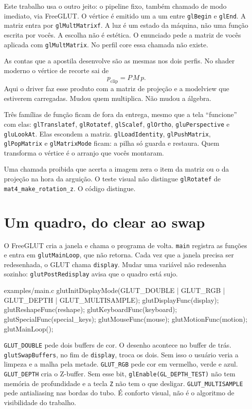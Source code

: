 \documentclass[11pt,a4paper]{article}
\newcommand{\fn}[1]{\texttt{\nobreak\hspace{0pt}#1}}
\begin{document}
Este trabalho usa o outro jeito: o pipeline fixo, também chamado de modo imediato, via FreeGLUT. O vértice é emitido um a um entre \fn{glBegin} e \fn{glEnd}. A matriz entra por \fn{glMultMatrixf}. A luz é um estado da máquina, não uma função escrita por vocês. A escolha não é estética. O enunciado pede a matriz de vocês aplicada com \fn{glMultMatrix}. No perfil core essa chamada não existe.

As contas que a apostila desenvolve são as mesmas nos dois perfis. No shader moderno o vértice de recorte sai de
\[
  p_{\text{clip}} = P \, M \, p .
\]
Aqui o driver faz esse produto com a matriz de projeção e a modelview que estiverem carregadas. Mudou quem multiplica. Não mudou a álgebra.

Três famílias de função ficam de fora da entrega, mesmo que a tela ``funcione'' com elas: \fn{glTranslatef}, \fn{glRotatef}, \fn{glScalef}, \fn{glOrtho}, \fn{gluPerspective} e \fn{gluLookAt}. Elas escondem a matriz. \fn{glLoadIdentity}, \fn{glPushMatrix}, \fn{glPopMatrix} e \fn{glMatrixMode} ficam: a pilha só guarda e restaura. Quem transforma o vértice é o arranjo que vocês montaram.

\begin{cuidado}
Uma chamada proibida que acerta a imagem zera o item da matriz ou o da projeção na hora da arguição. O teste visual não distingue \fn{glRotatef} de \fn{mat4\_make\_rotation\_z}. O código distingue.
\end{cuidado}

\section{Um quadro, do clear ao swap}
\label{sec:quadro}

O FreeGLUT cria a janela e chama o programa de volta. \fn{main} registra as funções e entra em \fn{glutMainLoop}, que não retorna. Cada vez que a janela precisa ser redesenhada, o GLUT chama \fn{display}. Mudar uma variável não redesenha sozinho: \fn{glutPostRedisplay} avisa que o quadro está sujo.

\begin{codigo}{examples/main.c}
glutInitDisplayMode(GLUT_DOUBLE | GLUT_RGB | GLUT_DEPTH | GLUT_MULTISAMPLE);
glutDisplayFunc(display);
glutReshapeFunc(reshape);
glutKeyboardFunc(keyboard);
glutSpecialFunc(special_keys);
glutMouseFunc(mouse);
glutMotionFunc(motion);
glutMainLoop();
\end{codigo}

\fn{GLUT\_DOUBLE} pede dois buffers de cor. O desenho acontece no buffer de trás. \fn{glutSwapBuffers}, no fim de \fn{display}, troca os dois. Sem isso o usuário veria a limpeza e a malha pela metade. \fn{GLUT\_RGB} pede cor em vermelho, verde e azul. \fn{GLUT\_DEPTH} cria o Z-buffer. Sem esse bit, \fn{glEnable(GL\_DEPTH\_TEST)} não tem memória de profundidade e a tecla \fn{Z} não tem o que desligar. \fn{GLUT\_MULTISAMPLE} pede antialiasing nas bordas do tubo. É conforto visual, não é o algoritmo de visibilidade do trabalho.
\end{document}
